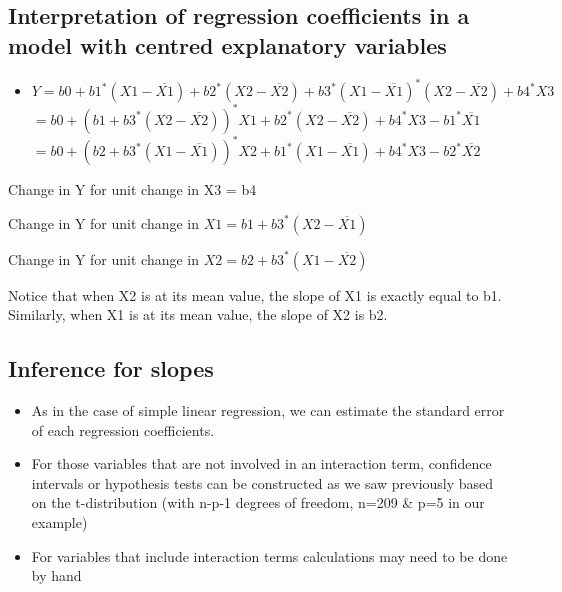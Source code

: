 \documentclass[
]{book}
\providecommand{\tightlist}{%
  \setlength{\itemsep}{0pt}\setlength{\parskip}{0pt}}
\begin{document}
\hypertarget{interpretation-of-regression-coefficients-in-a-model-with-centred-explanatory-variables}{%
\subsection{Interpretation of regression coefficients in a model with centred explanatory variables}\label{interpretation-of-regression-coefficients-in-a-model-with-centred-explanatory-variables}}

\begin{itemize}
\tightlist
\item
  \(Y=b0+b1^*(X1-\overline{X1})+b2^*(X2-\overline{X2})+b3^*(X1-\overline{X1})^*(X2-\overline{X2})+b4^*X3\)\\
  \(=b0+(b1+b3^*(X2-\overline{X2}))^*X1+b2^*(X2-\overline{X2})+b4^*X3-b1^*\overline{X1}\)\\
  \(=b0+(b2+b3^*(X1-\overline{X1}))^*X2+b1^*(X1-\overline{X1})+b4^*X3-b2^*\overline{X2}\)
\end{itemize}

Change in Y for unit change in X3 = b4

Change in Y for unit change in \(X1 = b1 + b3^*(X2-\overline{X1})\)

Change in Y for unit change in \(X2 = b2 + b3^*(X1-\overline{X2})\)

Notice that when X2 is at its mean value, the slope of X1 is exactly equal to b1. Similarly, when X1 is at its mean value, the slope of X2 is b2.

\hypertarget{inference-for-slopes}{%
\subsection{Inference for slopes}\label{inference-for-slopes}}

\begin{itemize}
\tightlist
\item
  As in the case of simple linear regression, we can estimate the standard error of each regression coefficients.
\item
  For those variables that are not involved in an interaction term, confidence intervals or hypothesis tests can be constructed as we saw previously based on the t-distribution (with n-p-1 degrees of freedom, n=209 \& p=5 in our example)
\item
  For variables that include interaction terms calculations may need to be done by hand
\end{itemize}
\end{document}
